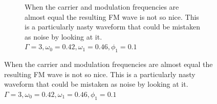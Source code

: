 \documentclass[onecolumn, groupedaddress, 10pt]{revtex4-1}
\begin{document}
\begin{figure}[H]
\begin{subfigure}{.5\textwidth}
  		\caption{When the carrier and modulation frequencies are almost equal the resulting FM wave is not so nice.  This is a particularly nasty waveform that could be mistaken as noise by looking at it. $\Gamma = 3, \omega_0 = 0.42, \omega_1 = 0.46, \phi_1 = 0.1$ \label{fig:nastySignal}}
	\end{subfigure}
\end{figure}


\end{document}
